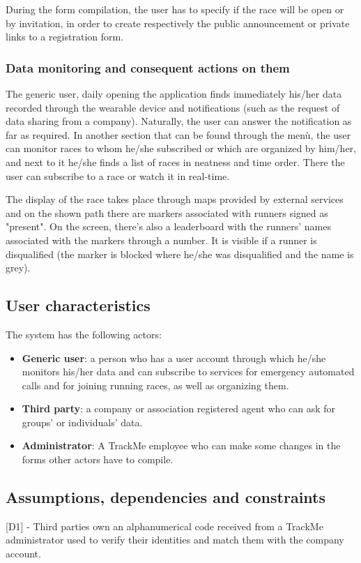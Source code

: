During the form compilation, the user has to specify if the race will be open or by invitation, in order to create respectively the public announcement or private links to a registration form.
 
\subsubsection{Data monitoring and consequent actions on them}

The generic user, daily opening the application finds immediately his/her data recorded through the wearable device and notifications (such as the request of data sharing from a company). Naturally, the user can answer the notification as far as required. In another section that can be found through the menù, the user can monitor races to whom he/she subscribed or which are organized by him/her, and next to it he/she finds a list of races in neatness and time order. There the user can subscribe to a race or watch it in real-time.

The display of the race takes place through maps provided by external services and on the shown path there are markers associated with runners signed as "present". On the screen, there's also a leaderboard with the runners' names associated with the markers through a number. It is visible if a runner is disqualified (the marker is blocked where he/she was disqualified and the name is grey).
 
\subsection{User characteristics}
The system has the following actors:
\begin{itemize}
\item \textbf{Generic user}: a person who has a user account through which he/she monitors his/her data and can subscribe to services for emergency automated calls and for joining running races, as well as organizing them.
\item \textbf{Third party}: a company or association registered agent who can ask for groups' or individuals' data.
\item \textbf{Administrator}: A TrackMe employee who can make some changes in the forms other actors have to compile.
\end{itemize}

\subsection{Assumptions, dependencies and constraints}
[D1] - Third parties own an alphanumerical code received from a TrackMe administrator used to verify their identities and match them with the company account. \newline

